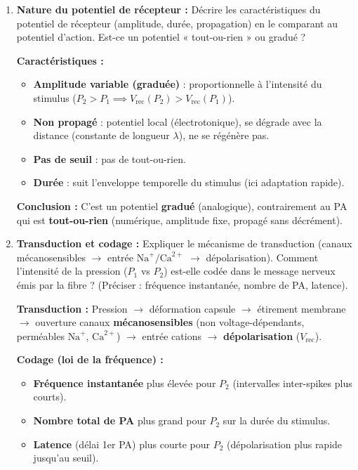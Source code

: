 \documentclass[11pt]{article}
\begin{document}
\begin{exercice}
\begin{enumerate}
\item \textbf{Nature du potentiel de récepteur :} Décrire les caractéristiques du potentiel de récepteur (amplitude, durée, propagation) en le comparant au potentiel d'action. Est-ce un potentiel « tout-ou-rien » ou gradué ?
\par \textbf{Caractéristiques :} 
\begin{itemize}
\item \textbf{Amplitude variable (graduée)} : proportionnelle à l'intensité du stimulus ($P_2 > P_1 \implies V_{\text{rec}}(P_2) > V_{\text{rec}}(P_1)$).
\item \textbf{Non propagé} : potentiel local (électrotonique), se dégrade avec la distance (constante de longueur $\lambda$), ne se régénère pas.
\item \textbf{Pas de seuil} : pas de tout-ou-rien.
\item \textbf{Durée} : suit l'enveloppe temporelle du stimulus (ici adaptation rapide).
\end{itemize}
\par \textbf{Conclusion :} C'est un potentiel \textbf{gradué} (analogique), contrairement au PA qui est \textbf{tout-ou-rien} (numérique, amplitude fixe, propagé sans décrément).
\item \textbf{Transduction et codage :} Expliquer le mécanisme de transduction (canaux mécanosensibles $\to$ entrée $\text{Na}^+/\text{Ca}^{2+}$ $\to$ dépolarisation). Comment l'intensité de la pression ($P_1$ vs $P_2$) est-elle codée dans le message nerveux émis par la fibre ? (Préciser : fréquence instantanée, nombre de PA, latence).
\par \textbf{Transduction :} Pression $\to$ déformation capsule $\to$ étirement membrane $\to$ ouverture canaux \textbf{mécanosensibles} (non voltage-dépendants, perméables $\text{Na}^+$, $\text{Ca}^{2+}$) $\to$ entrée cations $\to$ \textbf{dépolarisation} ($V_{\text{rec}}$).
\par \textbf{Codage (loi de la fréquence) :} 
\begin{itemize}
\item \textbf{Fréquence instantanée} plus élevée pour $P_2$ (intervalles inter-spikes plus courts).
\item \textbf{Nombre total de PA} plus grand pour $P_2$ sur la durée du stimulus.
\item \textbf{Latence} (délai 1er PA) plus courte pour $P_2$ (dépolarisation plus rapide jusqu'au seuil).
\end{itemize}

\end{enumerate}
\end{exercice}
\end{document}
